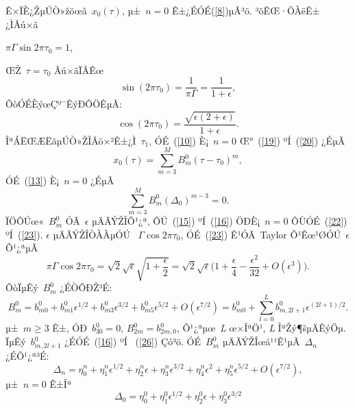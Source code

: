 \documentclass[12pt,openany,CJK,oneside]{cctbook}
\begin{document}
{Ê×ÏÈ¿ŽµÚÒ»žöœâ\ $x_{0}(\tau)$, µ±\ $n=0$ Ê±¿ÉÓÉ(\ref{8})µÃ³ö. ³õÊŒ·ÖÀëÊ±¿ÌÂú×ã\
\begin{center}
$\pi\Gamma\sin2\pi\tau_{0}=1$,
\end{center}
ŒŽ\ $\tau=\tau_{0}$ Âú×ãÏÂÊœ
\begin{equation}\label{22}
  \sin(2\pi\tau_{0})=\frac{1}{\pi\Gamma}=\frac{1}{1+\epsilon},
\end{equation}
ÔòÓÉÈýœÇº¯ÊýÐÔÖÊµÃ:
\begin{equation}\label{23}
  \cos(2\pi\tau_{0})=\frac{\sqrt{\epsilon(2+\epsilon)}}{1+\epsilon}.
\end{equation}
ÎªÁËŒÆËãµÚÒ»ŽÎÅö×²Ê±¿Ì\ $\tau_{1}$, ÓÉ\ (\ref{10}) È¡\ $n=0$ Œ°\ (\ref{19}) ºÍ\ (\ref{20}) ¿ÉµÃ
\begin{equation}\label{24}
  x_{0}(\tau)=\sum_{m=3}^{M}B_{m}^{0}(\tau-\tau_{0})^{m},
\end{equation}
ÓÉ\ (\ref{13}) È¡\ $n = 0$ ¿ÉµÃ
\begin{equation}\label{25}
  \sum_{m=3}^{M}B_{m}^{0}(\Delta_{0})^{m-3}=0.
\end{equation}
ÏÖÔÚœ«\ $B_{m}^{0}$ ÓÃ\ $\epsilon$ µÄÃÝŽÎÕ¹¿ª, ÔÚ\ (\ref{15}) ºÍ\ (\ref{16}) ÖÐÈ¡\ $n = 0$ ÔÙÓÉ\ (\ref{22}) ºÍ\ (\ref{23}). $\epsilon$ µÄÃÝŽÎÒÀÀµÓÚ \ $\Gamma\cos2\pi\tau_{0}$, ÓÉ\ (\ref{23}) Ê¹ÓÃ\ Taylor Õ¹Êœ¹ØÓÚ\ $\epsilon$ Õ¹¿ªµÃ
\begin{equation}\label{26}
  \pi\Gamma\cos2\pi\tau_{0}=\sqrt{2}\sqrt{\epsilon}\sqrt{1+\frac{\epsilon}{2}}
  =\sqrt{2}\sqrt{\epsilon}\Big(1+\frac{\epsilon}{4}-\frac{\epsilon^{2}}{32}+O(\epsilon^{3})\Big).
\end{equation}
ÔòÏµÊý\ $B_{m}^{0}$ ¿ÉÒÔÐŽ³É:
\begin{equation}\label{27}
  B_{m}^{0}=b_{m0}^{0}+b_{m1}^{0}\epsilon^{1/2}+b_{m3}^{0}\epsilon^{3/2}+b_{m5}^{0}\epsilon^{5/2}
  +O(\epsilon^{7/2})=b_{m0}^{0}+\sum_{l=0}^{L}b_{m,2l+1}^{0}\epsilon^{(2l+1)/2}.
\end{equation}
 µ±\ $m\geq3$ Ê±, ÓÐ\ $b_{30}^{0}=0$, $B_{2m}^{0}=b_{2m,0}^{0}$, Õ¹¿ªµœ\ \emph{L} œ×ÎªÖ¹, \emph{L} ÎªŽý¶šµÄÊýÖµ. ÏµÊý\ $b_{m,2l+1}^{0}$
 ¿ÉÓÉ\ (\ref{16}) ºÍ \ (\ref{26}) Çó³ö. ÓÉ\ $B_{m}^{0}$ µÄÃÝŽÎœá¹¹Ê¹µÃ\ $\Delta_{n}$ ¿ÉÕ¹¿ª³É:
\begin{equation}\label{28}
\Delta_{n}=\eta_{0}^{n}+\eta_{1}^{n}\epsilon^{1/2}+\eta_{2}^{n}\epsilon+\eta_{3}^{n}\epsilon^{3/2}
+\eta_{4}^{n}\epsilon^{2}+\eta_{5}^{n}\epsilon^{5/2}+O(\epsilon^{7/2}),
\end{equation}
µ±\ $ n = 0$ Ê±Îª
\begin{equation}\label{29}
  \Delta_{0}=\eta_{0}^{0}+\eta_{1}^{0}\epsilon^{1/2}+\eta_{2}^{0}\epsilon+\eta_{3}^{0}\epsilon^{3/2}

\end{equation}}
\end{document}
